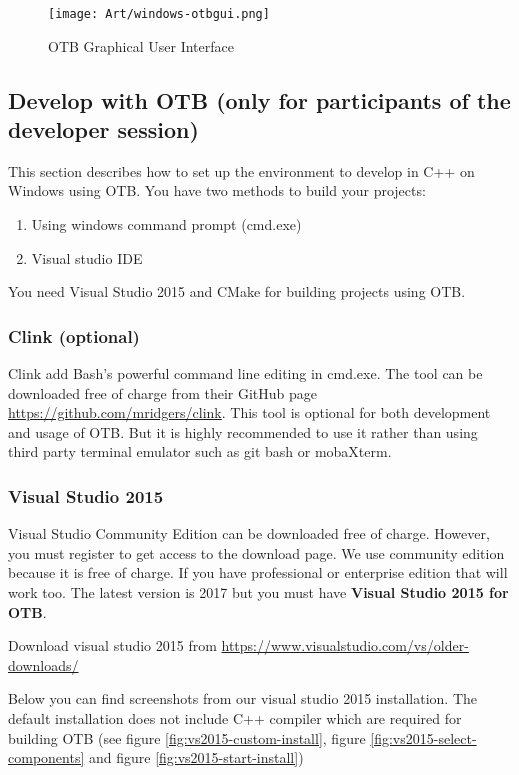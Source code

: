 \documentclass[10pt,a4paper]{article}
\begin{document}
\begin{figure}[!htbp]
  \center
  \texttt{[image: Art/windows-otbgui.png]}
  \caption[]{OTB Graphical User Interface}
  \label{fig:windows-otbgui}
\end{figure}


\subsection{Develop with OTB (only for participants of the developer session)}

This section describes how to set up the environment to develop in C++ on
Windows using OTB.
You have two methods to build your projects:
\begin{enumerate}
\item Using windows command prompt (cmd.exe)
\item Visual studio IDE
\end{enumerate}

You need Visual Studio 2015 and CMake for building projects using OTB.

\subsubsection{Clink (optional)}
Clink add Bash's powerful command line editing in
cmd.exe. The tool can be downloaded free of charge from their GitHub
page \url{https://github.com/mridgers/clink}. This tool is optional for both development and usage of OTB.
But it is highly recommended to use it rather than using third party terminal emulator such as git bash or
mobaXterm.

\subsubsection{Visual Studio 2015}
Visual Studio Community Edition can be downloaded free of charge. However, you must register
to get access to the download page. We use community edition because it is free
of charge. If you have professional or enterprise edition that will work
too. The latest version is 2017 but you must have \textbf{Visual Studio 2015 for OTB}. 

Download visual studio 2015 from \url{https://www.visualstudio.com/vs/older-downloads/}

Below you can find screenshots from our visual studio 2015 installation.
The default installation does not include C++ compiler which are required for
building OTB (see figure \ref{fig:vs2015-custom-install}, figure \ref{fig:vs2015-select-components}
and figure \ref{fig:vs2015-start-install})
\end{document}
